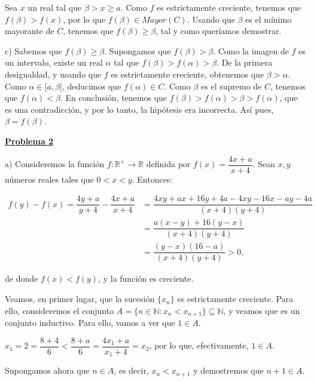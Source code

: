 \documentclass[10pt,a4paper]{article}
\begin{document}
	Sea $x$ un real tal que $\beta > x  \geq a$. Como $f$ es estrictamente creciente, tenemos que $f(\beta) > f(x)$, por lo que $f(\beta) \in Mayor(C)$. Usando que $\beta$ es el mínimo mayorante de $C$, tenemos que $f(\beta) \geq \beta$, tal y como queríamos demostrar. \newline
	
	c) Sabemos que $f(\beta) \geq \beta$. Supongamos que $f(\beta) > \beta$. Como la imagen de $f$ es un intervalo, existe un real $\alpha$ tal que $f(\beta) > f(\alpha) > \beta$. De la primera desigualdad, y usando que $f$ es estrictamente creciente, obtenemos que $\beta > \alpha$. Como $\alpha \in [a, \beta[$, deducimos que $f(\alpha) \in C$. Como $\beta$ es el supremo de $C$, tenemos que $f(\alpha) < \beta$. En conclusión, tenemos que  $f(\beta) > f(\alpha) > \beta > f(\alpha)$, que es una contradicción, y por lo tanto, la hipótesis era incorrecta. Así pues, $\beta = f(\beta)$. \newline
	
	\begin{flushleft}
		\textbf{\underline{Problema 2}}
	\end{flushleft}	

	a) Consideremos la función $f: \mathbb{R}^+ \rightarrow \mathbb{R}$ definida por $f(x) = \dfrac{4x + a}{x+4}$. Sean $x, y$ números reales tales que $0 < x < y$. Entonces:
	
	\begin{equation*}
		\begin{split}
			f(y)-f(x) = \dfrac{4y+a}{y+4} - \dfrac{4x+a}{x+4} & = \dfrac{4xy+ax+16y+4a-4xy-16x-ay-4a}{(x+4)(y+4)} \\
			& = \dfrac{a(x-y)+16(y-x)}{(x+4)(y+4)} \\
			& = \dfrac{(y-x)(16-a)}{(x+4)(y+4)} > 0,
		\end{split}
	\end{equation*}
	
	de donde $f(x) <f(y)$, y la función es creciente. \newline
	
	Veamos, en primer lugar, que la sucesión $\{x_n\}$ es estrictamente creciente. Para ello, consideremos el conjunto $A = \{n \in \mathbb{N} : x_n < x_{n+1}\} \subseteq \mathbb{N}$, y veamos que es un conjunto inductivo. Para ello, vamos a ver que $1 \in A$.
	
	$x_1 = 2 = \dfrac{8+4}{6} < \dfrac{8+a}{6} = \dfrac{4 x_1 + a}{x_1 + 4} = x_2$, por lo que, efectivamente, $1 \in A$.
	
	Supongamos ahora que $n \in A$, es decir, $x_n < x_{n+1}$ y demostremos que $n+1 \in A$.
	
\end{document}
